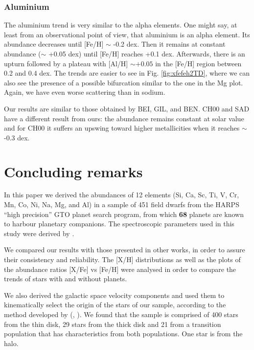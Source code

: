\documentclass[oldversion]{aa}
\begin{document}
\subsubsection {Aluminium}

The aluminium trend is very similar to the alpha elements. One might say, at least from an observational point of view, that aluminium is an alpha element. Its abundance decreases until [Fe/H] $\sim$ -0.2 dex. Then it remains at constant abundance ($\sim$ +0.05 dex) until [Fe/H] reaches +0.1 dex. Afterwards, there is an upturn followed by a plateau with [Al/H] $\sim +0.05$ in the [Fe/H] region between 0.2 and 0.4 dex. The trends are easier to see in Fig. \ref{fig:xfefeh2TD}, where we can also see the presence of a possible bifurcation similar to the one in the Mg plot. Again, we have even worse scattering than in sodium. %

Our results are similar to those obtained by BEI, GIL, and BEN. CH00 and SAD have a different result from ours: the abundance remains constant at solar value and for CH00 it suffers an upswing toward higher metallicities when it reaches $\sim$ -0.3 dex. %

\section {Concluding remarks}
\label{sec:conclusion}

In this paper we derived the abundances of 12 elements (Si, Ca, Sc, Ti, V, Cr, Mn, Co, Ni, Na, Mg, and Al) in a sample of 451 field dwarfs from the HARPS ``high precision'' GTO planet search program, from which \textbf{68} planets are known to harbour planetary companions. The spectroscopic parameters used in this study were derived by \citet{Sousa-2008}. 

We compared our results with those presented in other works, in order to assure their consistency and reliability.  The [X/H] distributions as well as the plots of the abundance ratios [X/Fe] vs [Fe/H] were analysed in order to compare the trends of stars with and without planets. %

We also derived the galactic space velocity components and used them to kinematically select the origin of the stars of our sample, according to the method developed by \citeauthor{Bensby-2003} (\citeyear{Bensby-2003}, \citeyear{Bensby-2005}). We found that the sample is comprised of 400 stars from the thin disk, 29 stars from the thick disk and 21 from a transition population that has characteristics from both populations. One star is from the halo.
\end{document}
